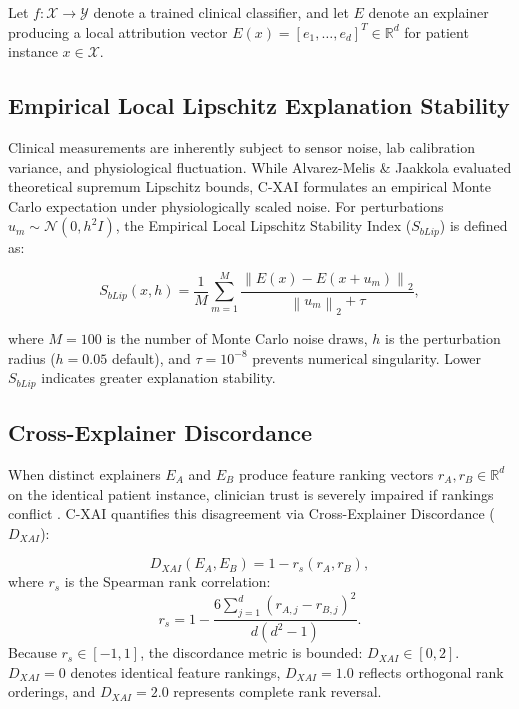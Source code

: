 \documentclass[3p,times,procedia]{elsarticle}
\theoremstyle{definition}
\begin{document}
Let $f:\mathcal{X}\rightarrow\mathcal{Y}$ denote a trained clinical classifier, and let $E$ denote an explainer producing a local attribution vector $E(x)=[e_1,\ldots,e_d]^T\in\mathbb{R}^{d}$ for patient instance $x\in\mathcal{X}$.

\subsection{Empirical Local Lipschitz Explanation Stability}

Clinical measurements are inherently subject to sensor noise, lab calibration variance, and physiological fluctuation. While Alvarez-Melis \& Jaakkola \cite{alvarezmelis2018towards} evaluated theoretical supremum Lipschitz bounds, C-XAI formulates an empirical Monte Carlo expectation under physiologically scaled noise. For perturbations $u_m\sim\mathcal{N}(0,h^2 I)$, the Empirical Local Lipschitz Stability Index ($S_{bLip}$) is defined as:

\begin{equation}
S_{bLip}(x,h)=
\frac{1}{M}\sum_{m=1}^{M}
\frac{\left\|E(x)-E(x+u_m)\right\|_2}
{\left\|u_m\right\|_2+\tau},
\label{eq:sblip}
\end{equation}

where $M=100$ is the number of Monte Carlo noise draws, $h$ is the perturbation radius ($h=0.05$ default), and $\tau=10^{-8}$ prevents numerical singularity. Lower $S_{bLip}$ indicates greater explanation stability.

\subsection{Cross-Explainer Discordance}

When distinct explainers $E_A$ and $E_B$ produce feature ranking vectors $r_A, r_B \in \mathbb{R}^d$ on the identical patient instance, clinician trust is severely impaired if rankings conflict \cite{krishna2022disagreement,mitrut2024clarity}. C-XAI quantifies this disagreement via Cross-Explainer Discordance ($D_{XAI}$):

\begin{equation}
D_{XAI}(E_A,E_B) = 1 - r_s(r_A, r_B),
\label{eq:dxai}
\end{equation}
where $r_s$ is the Spearman rank correlation:
\begin{equation}
r_s = 1 - \frac{6\sum_{j=1}^{d}(r_{A,j}-r_{B,j})^2}{d(d^2-1)}.
\label{eq:spearman}
\end{equation}
Because $r_s \in [-1, 1]$, the discordance metric is bounded: $D_{XAI} \in [0, 2]$. $D_{XAI} = 0$ denotes identical feature rankings, $D_{XAI} = 1.0$ reflects orthogonal rank orderings, and $D_{XAI} = 2.0$ represents complete rank reversal.
\end{document}
